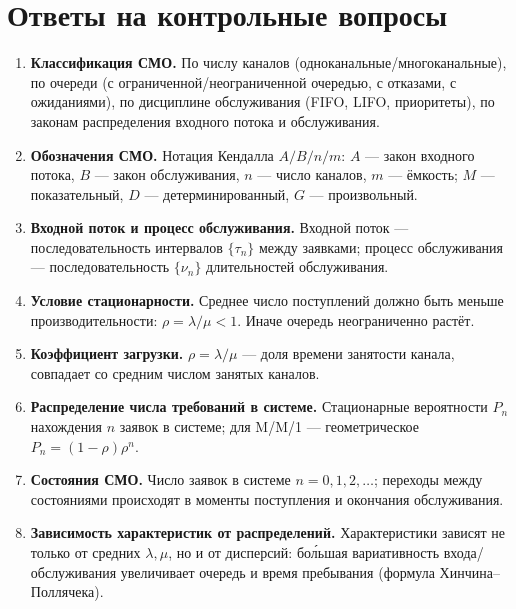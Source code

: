 \documentclass[a4paper,14pt,oneside,openany]{memoir}
\begin{document}
\section*{Ответы на контрольные вопросы}
\begin{enumerate}
    \item \textbf{Классификация СМО.} По числу каналов (одноканальные/многоканальные), по очереди (с ограниченной/неограниченной очередью, с отказами, с ожиданиями), по дисциплине обслуживания (FIFO, LIFO, приоритеты), по законам распределения входного потока и обслуживания.
    \item \textbf{Обозначения СМО.} Нотация Кендалла $A/B/n/m$: $A$ --- закон входного потока, $B$ --- закон обслуживания, $n$ --- число каналов, $m$ --- ёмкость; $M$ --- показательный, $D$ --- детерминированный, $G$ --- произвольный.
    \item \textbf{Входной поток и процесс обслуживания.} Входной поток --- последовательность интервалов $\{\tau_n\}$ между заявками; процесс обслуживания --- последовательность $\{\nu_n\}$ длительностей обслуживания.
    \item \textbf{Условие стационарности.} Среднее число поступлений должно быть меньше производительности: $\rho=\lambda/\mu<1$. Иначе очередь неограниченно растёт.
    \item \textbf{Коэффициент загрузки.} $\rho=\lambda/\mu$ --- доля времени занятости канала, совпадает со средним числом занятых каналов.
    \item \textbf{Распределение числа требований в системе.} Стационарные вероятности $P_n$ нахождения $n$ заявок в системе; для M/M/1 --- геометрическое $P_n=(1-\rho)\rho^n$.
    \item \textbf{Состояния СМО.} Число заявок в системе $n=0,1,2,\dots$; переходы между состояниями происходят в моменты поступления и окончания обслуживания.
    \item \textbf{Зависимость характеристик от распределений.} Характеристики зависят не только от средних $\lambda,\mu$, но и от дисперсий: бо\'льшая вариативность входа/обслуживания увеличивает очередь и время пребывания (формула Хинчина--Поллячека).
\end{enumerate}
\end{document}
